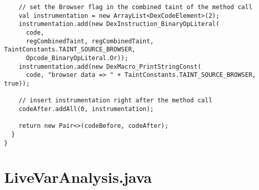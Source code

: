 \begin{lstlisting}
    // set the Browser flag in the combined taint of the method call
    val instrumentation = new ArrayList<DexCodeElement>(2);
    instrumentation.add(new DexInstruction_BinaryOpLiteral(
      code, 
      regCombinedTaint, regCombinedTaint, TaintConstants.TAINT_SOURCE_BROWSER, 
      Opcode_BinaryOpLiteral.Or));
    instrumentation.add(new DexMacro_PrintStringConst(
      code, "browser data => " + TaintConstants.TAINT_SOURCE_BROWSER, true));

    // insert instrumentation right after the method call
    codeAfter.addAll(0, instrumentation);

    return new Pair<>(codeBefore, codeAfter);
  }
}
\end{lstlisting}

\section{LiveVarAnalysis.java}

